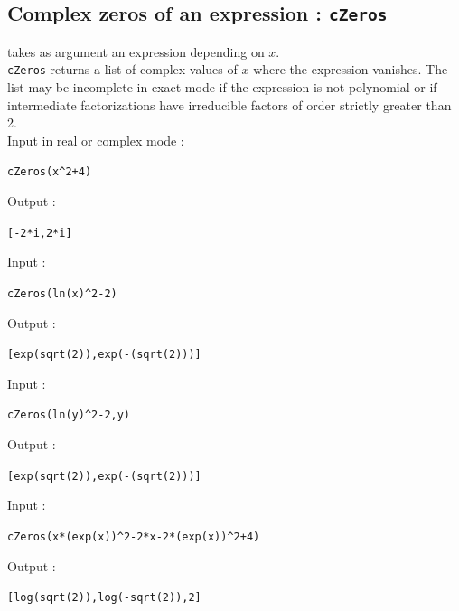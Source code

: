 \documentclass[a4paper,11pt]{book}
\begin{document}
\subsection{Complex zeros of an expression : {\tt cZeros}}
 takes as argument an expression depending on $x$.\\
{\tt cZeros} returns a list of complex values of $x$ where the expression
vanishes. The list may be incomplete in exact mode if the expression
is not polynomial or if intermediate
factorizations have irreducible factors of order strictly
greater than 2.\\
Input in real or complex mode : 
\begin{center}{\tt cZeros(x\verb|^|2+4)}\end{center} 
Output :
\begin{center}{\tt [-2*i,2*i]}\end{center} 
Input : 
\begin{center}{\tt cZeros(ln(x)\verb|^|2-2)}\end{center} 
Output :
\begin{center}{\tt [exp(sqrt(2)),exp(-(sqrt(2)))]}\end{center} 
Input : 
\begin{center}{\tt cZeros(ln(y)\verb|^|2-2,y)}\end{center} 
Output :
\begin{center}{\tt [exp(sqrt(2)),exp(-(sqrt(2)))]}\end{center} 
Input : 
\begin{center}{\tt cZeros(x*(exp(x))\verb|^|2-2*x-2*(exp(x))\verb|^|2+4)}\end{center} 
Output :
\begin{center}{\tt [log(sqrt(2)),log(-sqrt(2)),2]}\end{center} 
\end{document}
